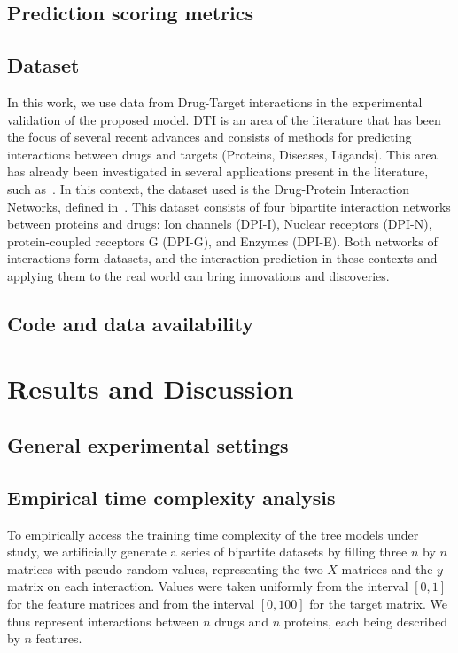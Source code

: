 \documentclass[conference]{IEEEtran}
\begin{document}
\subsection{Prediction scoring metrics}

\subsection{Dataset}
In this work, we use data from Drug-Target interactions in the experimental validation of the proposed model. DTI is an area of the literature that has been the focus of several recent advances and consists of methods for predicting interactions between drugs and targets (Proteins, Diseases, Ligands). This area has already been investigated in several applications present in the literature, such as~\cite{Fattahi2019,Nasution2019}. In this context, the dataset used is the Drug-Protein Interaction Networks, defined in~\cite{Yamanishi2008}. This dataset consists of four bipartite interaction networks between proteins and drugs: Ion channels (DPI-I), Nuclear receptors (DPI-N), protein-coupled receptors G (DPI-G), and Enzymes (DPI-E). Both networks of interactions form datasets, and the interaction prediction in these contexts and applying them to the real world can bring innovations and discoveries.

\subsection{Code and data availability}

\section{Results and Discussion}

\subsection{General experimental settings}


\subsection{Empirical time complexity analysis}
\label{sec:empirical_complexity}

To empirically access the training time complexity of the tree models under study, we artificially generate a series of bipartite datasets by filling three $n$ by $n$ matrices with pseudo-random values, representing the two $X$ matrices and the $y$ matrix on each interaction. Values were taken uniformly from the interval $[0, 1]$ for the feature matrices and from the interval $[0, 100]$ for the target matrix. We thus represent interactions between $n$ drugs and $n$ proteins, each being described by $n$ features.
\end{document}
